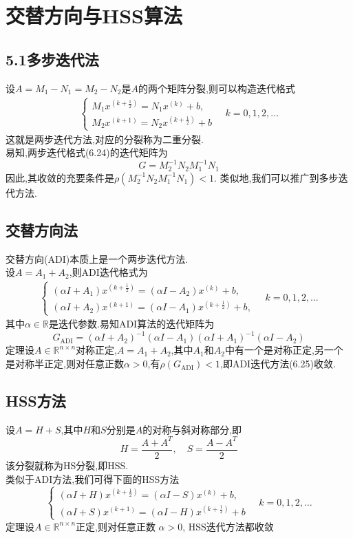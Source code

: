 \documentclass[12pt,a4paper]{article}
\begin{document}
\section{交替方向与HSS算法}
\subsection{5.1多步迭代法}
设$A=M_{1}-N_{1}=M_{2}-N_{2}$是$A$的两个矩阵分裂,则可以构造迭代格式
\begin{align*}
\left\{\begin{array}{l}{M_{1} x^{\left(k+\frac{1}{2}\right)}=N_{1} x^{(k)}+b,} \\ {M_{2} x^{(k+1)}=N_{2} x^{\left(k+\frac{1}{2}\right)}+b}\end{array} \quad k=0,1,2, \ldots\right.
\tag{6.24}
\end{align*}
这就是两步迭代方法,对应的分裂称为二重分裂.\\
易知,两步迭代格式(6.24)的迭代矩阵为
$$
G=M_{2}^{-1} N_{2} M_{1}^{-1} N_{1}
$$
因此,其收敛的充要条件是$\rho\left(M_{2}^{-1} N_{2} M_{1}^{-1} N_{1}\right)<1$.
类似地,我们可以推广到多步迭代方法.
\subsection{交替方向法}
{\color{blue}交替方向(ADI)}本质上是一个两步迭代方法.\\
设$A=A_{1}+A_{2}$,则ADI迭代格式为
\begin{align*}
\left\{\begin{array}{l}{\left(\alpha I+A_{1}\right) x^{\left(k+\frac{1}{2}\right)}=\left(\alpha I-A_{2}\right) x^{(k)}+b,} \\ {\left(\alpha I+A_{2}\right) x^{(k+1)}=\left(\alpha I-A_{1}\right) x^{\left(k+\frac{1}{2}\right)}+b,}\end{array} \quad k=0,1,2, \ldots\right.
\tag{6.25}
\end{align*}
其中$\alpha \in \mathbb{R}$是迭代参数.易知ADI算法的迭代矩阵为
$$
G_{\mathrm{ADI}}=\left(\alpha I+A_{2}\right)^{-1}\left(\alpha I-A_{1}\right)\left(\alpha I+A_{1}\right)^{-1}\left(\alpha I-A_{2}\right)
$$
{\color{blue}定理}\qquad 设$A \in \mathbb{R}^{n \times n}$对称正定,$A=A_{1}+A_{2}$,其中$A_1$和$A_2$中有一个是对称正定,另一个是对称半正定,则对任意正数$\alpha>0$,有$\rho\left(G_{\mathrm{ADI}}\right)<1$,即ADI迭代方法(6.25)收敛.\\
\subsection{\color{blue}HSS方法}
设$A=H+S$,其中$H$和$S$分别是$A$的对称与斜对称部分,即
$$
H=\frac{A+A^{T}}{2}, \quad S=\frac{A-A^{T}}{2}
$$
该分裂就称为HS分裂,即HSS.\\
类似于ADI方法,我们可得下面的HSS方法\\
$$
\left\{\begin{array}{l}{(\alpha I+H) x^{\left(k+\frac{1}{2}\right)}=(\alpha I-S) x^{(k)}+b,} \\ {(\alpha I+S) x^{(k+1)}=(\alpha I-H) x^{\left(k+\frac{1}{2}\right)}+b}\end{array} \quad k=0,1,2, \ldots\right.
$$
{\color{blue}定理}\qquad 设$A \in \mathbb{R}^{n \times n}$正定,则对任意正数  $\alpha>0$, HSS迭代方法都收敛\\
\end{document}
